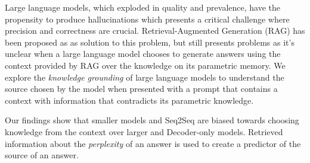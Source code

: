 Large language models, which exploded in quality and prevalence, have the propensity to produce hallucinations which presents a critical challenge where precision and correctness are crucial. Retrieval-Augmented Generation (RAG) has been proposed as as solution to this problem, but still presents problems as it's unclear when a large language model chooses to generate answers using the context provided by RAG over the knowledge on its parametric memory.
We explore the \emph{knowledge grounding} of large language models to understand the source chosen by the model when presented with a prompt that contains a context with information that contradicts its parametric knowledge.

Our findings show that smaller models and Seq2Seq are biased towards choosing knowledge from the context over larger and Decoder-only models.
Retrieved information about the \emph{perplexity} of an answer is used to create a predictor of the source of an answer.

